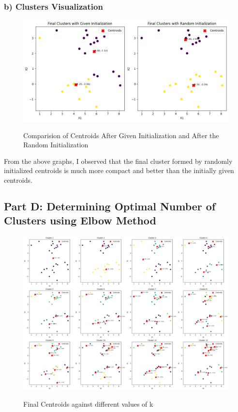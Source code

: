 \documentclass{article}
\begin{document}
\subsubsection*{b) Clusters Visualization}
\begin{figure}[H] %
    \centering
    \begin{minipage}{1\linewidth}
        \centering
        \includegraphics[scale=0.4]{assets/c.png}
        \caption{Comparision of Centroids After Given Initialization and After the Random Initialization}{}
        \label{fig:1c}
    \end{minipage}
\end{figure}

From the above graphs, I observed that the final cluster formed by randomly initialized centroids is much more compact and better than the initially given centroids.


\subsection*{Part D: Determining Optimal Number of Clusters using Elbow Method}
\begin{figure}[H] %
    \centering
    \begin{minipage}{1\linewidth}
        \centering
        \includegraphics[scale=0.35]{assets/d-a.png}
        \caption{Final Centroids against different values of k}{}
        \label{fig:1c}
    \end{minipage}
\end{figure}
\end{document}
